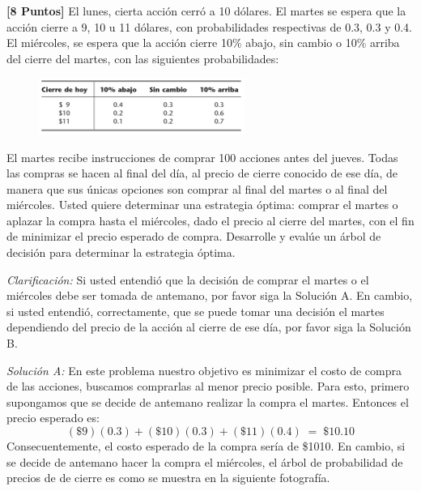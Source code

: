 \documentclass[ a4paper, twoside, 11pt]{article}
\begin{document}
\begin{problem}
\textbf{[8 Puntos]} El lunes, cierta acci\'on cerr\'o a 10 d\'olares. El martes se espera que la acci\'on cierre a 9, 10 u 11 d\'olares, con probabilidades respectivas de 0.3, 0.3 y 0.4. El mi\'ercoles, \linebreak se espera que la acci\'on cierre 10\% abajo, sin cambio o 10\% arriba del cierre del martes, con las siguientes probabilidades: 

\begin{figure}[htb]
\centering
\includegraphics[width=0.6\textwidth]{problema-acciones.jpg}
\end{figure}

El martes recibe instrucciones de comprar 100 acciones antes del jueves. Todas las compras se hacen al final del d\'ia, al precio de cierre conocido de ese d\'ia, de manera que sus \'unicas opciones son comprar al final del martes o al final del mi\'ercoles. Usted quiere determinar una estrategia \'optima: comprar el martes o aplazar la compra hasta el mi\'ercoles, dado el precio al cierre del martes, con el fin de minimizar el precio esperado de compra. Desarrolle y eval\'ue un \'arbol de decisi\'on para determinar la estrategia \'optima. 

\emph{Clarificaci\'on:} Si usted entendi\'o que la decisi\'on de comprar el martes o el mi\'ercoles debe ser tomada de antemano, por favor siga la Soluci\'on A. En cambio, si usted entendi\'o, correctamente, que se puede tomar una decisi\'on el martes dependiendo del precio de la acci\'on al cierre de ese d\'ia, por favor siga la Soluci\'on B. 

\emph{Soluci\'on A:} En este problema nuestro objetivo es minimizar el costo de compra de las acciones, \ie buscamos comprarlas al menor precio posible. Para esto, primero supongamos que se decide de antemano realizar la compra el martes. Entonces el precio esperado es: 
\[
(\$9)(0.3) + (\$10)(0.3) + (\$11)(0.4) \; = \; \$10.10
\]
Consecuentemente, el costo esperado de la compra ser\'ia de \$1010. En cambio, si se decide de antemano hacer la compra el mi\'ercoles, el \'arbol de probabilidad de precios de de cierre es como se muestra en la siguiente fotograf\'ia. 


\end{problem}
\end{document}
